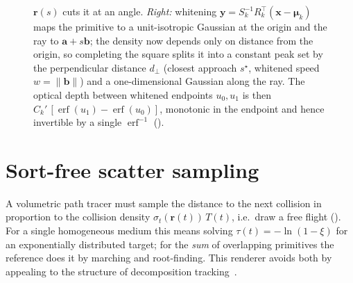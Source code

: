 \begin{figure}[htp]
{  $\bm{r}(s)$ cuts it at an angle. \emph{Right:} whitening
  $\bm{y}=S_k^{-1}R_k^{\!\top}(\bm{x}-\bm{\mu}_k)$ maps the primitive to a unit-isotropic Gaussian at
  the origin and the ray to $\bm{a}+s\bm{b}$; the density now depends only on distance from the origin,
  so completing the square splits it into a constant peak set by the perpendicular distance $d_\perp$
  (closest approach $s^\star$, whitened speed $w=\lVert\bm{b}\rVert$) and a one-dimensional Gaussian
  along the ray. The optical depth between whitened endpoints $u_0,u_1$ is then
  $C_k'\,[\operatorname{erf}(u_1)-\operatorname{erf}(u_0)]$, monotonic in the endpoint and hence
  invertible by a single $\operatorname{erf}^{-1}$ ().}
  \label{fig:optical-depth}
\end{figure}

\section{Sort-free scatter sampling}
\label{sec:adt}

A volumetric path tracer must sample the distance to the next collision in proportion to the collision
density $\sigma_t(\bm{r}(t))\,T(t)$, i.e.\ draw a free flight ().
For a single homogeneous medium this means solving $\tau(t) = -\ln(1-\xi)$ for an exponentially
distributed target; for the \emph{sum} of overlapping primitives the reference does it by marching and
root-finding. This renderer avoids both by appealing to the structure of decomposition
tracking~\cite{Kutz2017}.

